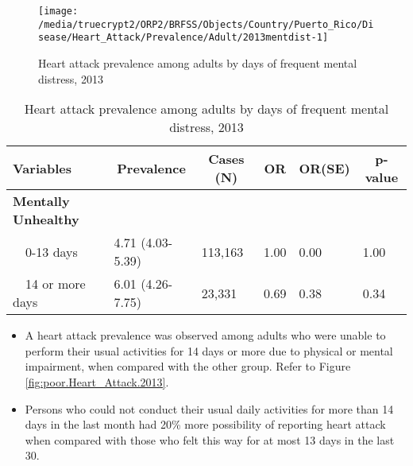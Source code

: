 \begin{figure}[H]
\centering
\caption{Heart attack prevalence among adults by days of frequent mental distress, 2013}
\label{fig:mental.Heart_Attack.2013}

\begin{knitrout}
\color{fgcolor}

{\centering \texttt{[image: /media/truecrypt2/ORP2/BRFSS/Objects/Country/Puerto\_Rico/Disease/Heart\_Attack/Prevalence/Adult/2013mentdist-1]} 

}



\end{knitrout}
 \end{figure}

\begin{table}[H]
\caption{Heart attack prevalence among adults by days of frequent mental distress, 2013\label{tab:mental.Heart_Attack.2013}} 
\begin{center}
\begin{tabular}{llllll}
\hline\hline
\multicolumn{1}{l}{Variables}&\multicolumn{1}{c}{Prevalence}&\multicolumn{1}{c}{Cases (N)}&\multicolumn{1}{c}{OR}&\multicolumn{1}{c}{OR(SE)}&\multicolumn{1}{c}{p-value}\tabularnewline
\hline
{\bfseries Mentally Unhealthy}&&&&&\tabularnewline
~~0-13 days&4.71 (4.03-5.39)&113,163&1.00&0.00&1.00\tabularnewline
~~14 or more days&6.01 (4.26-7.75)& 23,331&0.69&0.38&0.34\tabularnewline
\hline
\end{tabular}\end{center}

\end{table}



 \newpage
\begin{itemize}

\item A  
heart attack prevalence was observed among adults who were unable to perform their usual activities for 14 days or more due to physical or mental impairment, when compared with the other group. Refer to Figure \ref{fig:poor.Heart_Attack.2013}.



\item Persons who could not conduct their usual daily activities for more than 14 days in the last month had 20\% more possibility of reporting heart attack when compared with those who felt this way for at most 13 days in the last 30.

\end{itemize}

